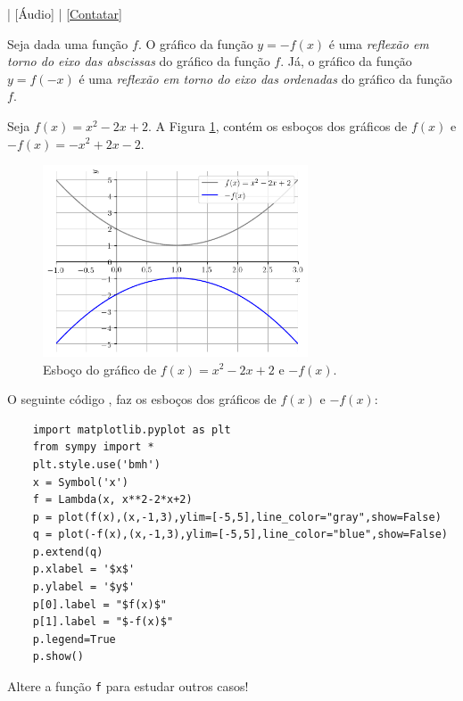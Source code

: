 \begin{flushright}
  [Vídeo] | [Áudio] | \href{https://phkonzen.github.io/notas/contato.html}{[Contatar]}
\end{flushright}

Seja dada uma função $f$. O gráfico da função $y = -f(x)$ é uma \emph{reflexão em torno do eixo das abscissas} do gráfico da função $f$. Já, o gráfico da função $y = f(-x)$ é uma \emph{reflexão em torno do eixo das ordenadas} do gráfico da função $f$.

\begin{ex}
  Seja $f(x) = x^2-2x+2$. A Figura \ref{fig:ex_reflex}, contém os esboços dos gráficos de $f(x)$ e $-f(x) = -x^2+2x-2$.

  \begin{figure}[H]
    \centering
    \includegraphics[width=0.7\textwidth]{./cap_funcao/dados/fig_ex_reflex/fig_ex_reflex}
    \caption{Esboço do gráfico de $f(x) = x^2-2x+2$ e $-f(x)$.}
    \label{fig:ex_reflex}
  \end{figure}

  \ifispython
  O seguinte código {\python}, faz os esboços dos gráficos de $f(x)$ e $-f(x)$:
  \begin{lstlisting}
    import matplotlib.pyplot as plt
    from sympy import *
    plt.style.use('bmh')
    x = Symbol('x')
    f = Lambda(x, x**2-2*x+2)
    p = plot(f(x),(x,-1,3),ylim=[-5,5],line_color="gray",show=False)
    q = plot(-f(x),(x,-1,3),ylim=[-5,5],line_color="blue",show=False)
    p.extend(q)
    p.xlabel = '$x$'
    p.ylabel = '$y$'
    p[0].label = "$f(x)$"
    p[1].label = "$-f(x)$"
    p.legend=True
    p.show()
  \end{lstlisting}
  Altere a função \verb+f+ para estudar outros casos!
  \fi
\end{ex}


